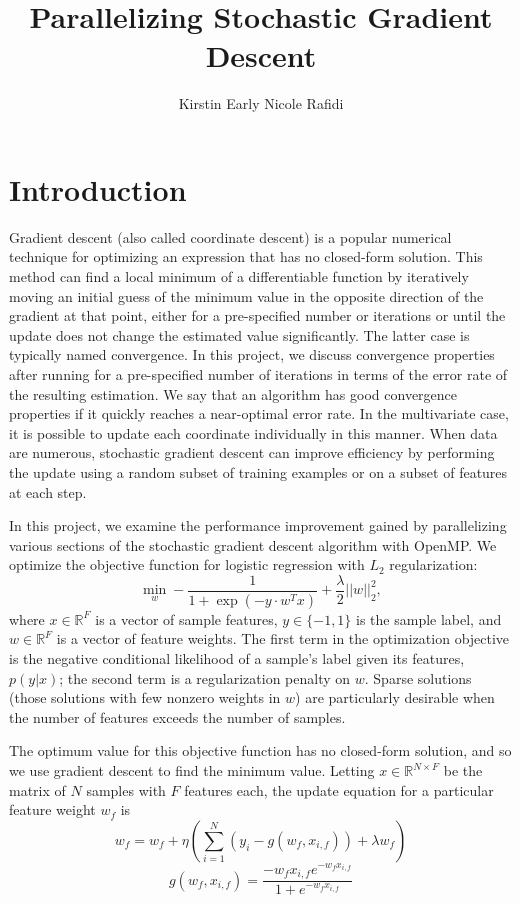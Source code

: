 \documentclass{article}
\title{Parallelizing Stochastic Gradient Descent}
\author{Kirstin Early \qquad Nicole Rafidi}
\begin{document}
\maketitle

\section{Introduction}
Gradient descent (also called coordinate descent) is a popular numerical technique for optimizing an expression that has no closed-form solution. This method can find a local minimum of a differentiable function by iteratively moving an initial guess of the minimum value in the opposite direction of the gradient at that point, either for a pre-specified number or iterations or until the update does not change the estimated value significantly. The latter case is typically named convergence. In this project, we discuss convergence properties after running for a pre-specified number of iterations in terms of the error rate of the resulting estimation. We say that an algorithm has good convergence properties if it quickly reaches a near-optimal error rate. In the multivariate case, it is possible to update each coordinate individually in this manner. When data are numerous, stochastic gradient descent can improve efficiency by performing the update using a random subset of training examples or on a subset of features at each step.

In this project, we examine the performance improvement gained by parallelizing various sections of the stochastic gradient descent algorithm with OpenMP. We optimize the objective function for logistic regression with $L_2$ regularization:
\begin{equation}
\underset{w}{\min}-\frac{1}{1 + \exp(-y \cdot w^T x)} + \frac{\lambda}{2}||w||^2_2,
\end{equation}
where $x \in \mathbb{R}^F$ is a vector of sample features, $y \in \lbrace -1, 1 \rbrace$ is the sample label, and $w \in \mathbb{R}^F$ is a vector of feature weights. The first term in the optimization objective is the negative conditional likelihood of a sample's label given its features, $p(y|x)$; the second term is a regularization penalty on $w$. Sparse solutions (those solutions with few nonzero weights in $w$) are particularly desirable when the number of features exceeds the number of samples.

The optimum value for this objective function has no closed-form solution, and so we use gradient descent to find the minimum value. Letting $x \in \mathbb{R}^{N \times F}$ be the matrix of $N$ samples with $F$ features each, the update equation for a particular feature weight $w_f$ is
\begin{equation}
w_f = w_f + \eta \left( \sum_{i = 1}^{N}(y_i - g(w_f, x_{i, f})) + \lambda w_f \right)
\end{equation}
\begin{equation}
g(w_f, x_{i,f}) = \frac{-w_fx_{i,f} e^{-w_fx_{i,f}}}{1 + e^{-w_fx_{i,f}}}
\end{equation}
\end{document}
